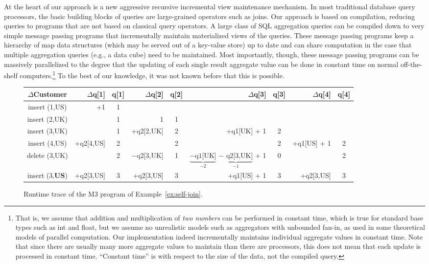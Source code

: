 At the heart of our approach is a new aggressive recursive incremental
view maintenance mechanism.
In most traditional database query processors, the  basic building blocks of
queries are large-grained operators such as joins.
Our approach is based on compilation, reducing
queries to programs that are not based on classical query operators.
A large class of
SQL aggregation queries can be compiled down to very simple message
passing programs that incrementally maintain materialized views of
the queries. These message passing programs keep a hierarchy of map data
structures (which may be served out of a key-value store) up to date
and can share computation in the case that multiple aggregation queries (e.g.,
a data cube) need to be maintained.  Most importantly, though, these message
passing programs can be massively parallelized to the degree that the updating
of each single result aggregate value can be done in constant time on normal
off-the-shelf computers.\footnote{That is,
we assume that addition and multiplication
of {\em two numbers} can be performed in constant time, which is true for
%
%
standard base types such as int and float,
but we assume no unrealistic models such
as aggregators with unbounded fan-in, as used in some theoretical models of
parallel computation. Our implementation indeed incrementally maintains
individual aggregate values in constant time. Note that since there are
usually many more aggregate values to maintain than there are processors,
this does not mean that each update is processed in constant time.
``Constant time'' is with respect to the size of the data, not the compiled
query.}
To the best of our knowledge, it was not known before
that this is possible.

\begin{figure*}[!]
\begin{center}
\begin{tabular}{c|rc|rc|rc|rc}
$\Delta$Customer
& $\Delta$q[1] & q[1]
& $\Delta$q[2] & q[2]
& $\Delta$q[3] & q[3]
& $\Delta$q[4] & q[4] \\
\hline
insert (1,US) &         +1 & 1 &              &   &              &   &&   \\
insert (2,UK) &            & 1 &            1 & 1 &              &   &&   \\
insert (3,UK) &            & 1 &   +q2[2,UK] & 2 & +q1[UK] + 1 & 2 &&   \\
insert (4,US) & +q2[4,US] & 2 &              & 2 &              & 2 & +q1[US] + 1 & 2 \\
delete (3,UK) &            & 2 & $-$q2[3,UK] & 1 & $\underbrace{\mbox{$-$q1[UK]}}_{-2}$ $\underbrace{\mbox{$-$ q2[3,UK]}}_{-1}$ + 1 & 0 && 2 \\
insert (3,{\bf US}) & +q2[3,US] & 3 &   +q2[3,US] & 3 & +q1[US] + 1 & 3 & +q2[3,US] & 3  \\
\end{tabular}
\end{center}

\vspace{-4mm}

\caption{Runtime trace of the M3 program of Example~\ref{ex:self-join}.}
\label{fig:trace}
\end{figure*}


